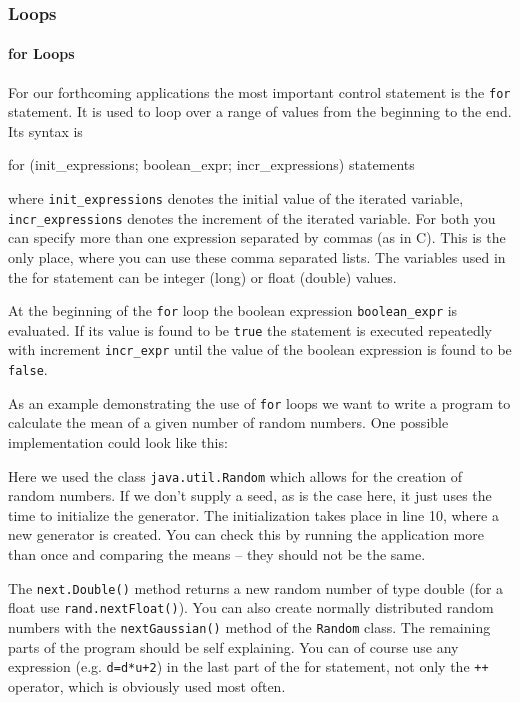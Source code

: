 \subsubsection{Loops}
\paragraph{for Loops}
For our forthcoming applications the most important control statement
is the \verb|for| statement. It is used to loop over a range of values
from the beginning to the end. Its syntax is
\begin{sverbatim}
for (init_expressions; boolean_expr; incr_expressions) {
    statements
}
\end{sverbatim}
where \verb|init_expressions| denotes the initial value of the iterated
variable, \verb|incr_expressions| denotes the increment of the iterated
variable. For both you can specify more than one expression separated
by commas (as in C). This is the only place, where you can use these comma
separated lists. The variables used in the for statement can be 
integer (long) or float (double) values. 

At the beginning of the \verb|for| loop the boolean expression
\verb|boolean_expr| is evaluated. If its value is found to be 
\verb|true| the statement is executed repeatedly with increment
\verb|incr_expr| until the value of the boolean expression is found to
be \verb|false|.

As an example demonstrating the use of
\verb|for| loops we want to write a program to calculate the mean of
a given number of random numbers. One possible implementation
could look like this:

Here we used the class \verb|java.util.Random| which allows for
the creation of random numbers. If we don't supply a seed, as is the
case here, it just uses the time to initialize the generator. The
initialization takes place in line 10, where a new generator is created.
You can check this by running the application more than once and comparing
the means -- they should not be the same. 

The \verb|next.Double()| method returns a new random number of type
double (for a float use \verb|rand.nextFloat()|). You can also create normally 
distributed random numbers with the \verb|nextGaussian()| method of
the \verb|Random| class.
The remaining parts of the program should be self explaining. You can of
course use any expression (e.g. \verb|d=d*u+2|) 
in the last part of the for statement, not only
the \verb|++| operator, which is obviously used most often. 

